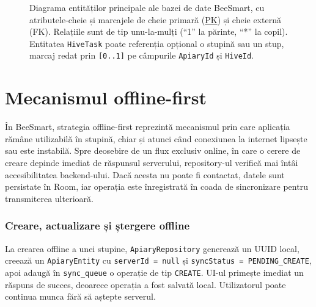 \begin{figure}[H]
{}
\caption{Diagrama entităților principale ale bazei de date BeeSmart, cu atributele-cheie și marcajele de cheie primară (\underline{PK}) și cheie externă (FK). Relațiile sunt de tip unu-la-mulți (\enquote{1} la părinte, \enquote{*} la copil). Entitatea \texttt{HiveTask} poate referenția opțional o stupină sau un stup, marcaj redat prin \texttt{[0..1]} pe câmpurile \texttt{ApiaryId} și \texttt{HiveId}.}
\label{fig:er-diagram}
\end{figure}

\section{Mecanismul offline-first}

În BeeSmart, strategia offline-first reprezintă mecanismul prin care aplicația rămâne utilizabilă în stupină, chiar și atunci când conexiunea la internet lipsește sau este instabilă. Spre deosebire de un flux exclusiv online, în care o cerere de creare depinde imediat de răspunsul serverului, repository-ul verifică mai întâi accesibilitatea backend-ului. Dacă acesta nu poate fi contactat, datele sunt persistate în Room, iar operația este înregistrată în coada de sincronizare pentru transmiterea ulterioară.

\subsubsection*{Creare, actualizare și ștergere offline}

La crearea offline a unei stupine, \texttt{ApiaryRepository} generează un UUID local, creează un \texttt{ApiaryEntity} cu \texttt{serverId = null} și \texttt{syncStatus = PENDING\_CREATE}, apoi adaugă în \texttt{sync\_queue} o operație de tip \texttt{CREATE}. UI-ul primește imediat un răspuns de succes, deoarece operația a fost salvată local. Utilizatorul poate continua munca fără să aștepte serverul.

